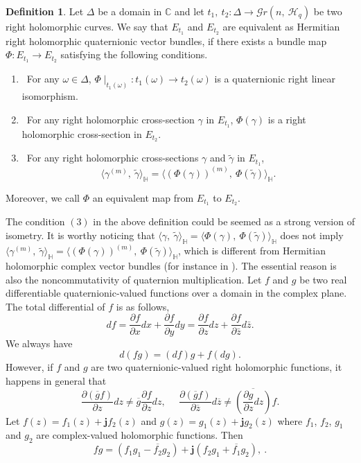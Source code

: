 \documentclass[pdflatex,sn-mathphys-num]{sn-jnl}%
\theoremstyle{thmstyleone}%
\theoremstyle{thmstyletwo}%
\theoremstyle{thmstylethree}%
\newtheorem{definition}{Definition}%
\theoremstyle{definition}
\newtheorem{definition}[theorem]{Definition}
\theoremstyle{remark}
\begin{document}
\begin{definition}\label{QBE}
	Let $\Delta$ be a domain in $\mathbb{C}$ and let $t_1,\ t_2:\Delta\rightarrow\mathcal{G}r(n,\ \mathcal{H}_q)$ be two right holomorphic curves. We say that $E_{t_1}$ and $E_{t_2}$ are equivalent as Hermitian right holomorphic quaternionic vector bundles, if there exists a bundle map $\Phi: E_{t_1} \rightarrow E_{t_2}$ satisfying the following conditions.
	\begin{enumerate}
		\item[(1)] \ For any $\omega\in\Delta$, $\Phi\mid_{t_1(\omega)}:t_1(\omega)\rightarrow t_2(\omega)$ is a quaternionic right linear isomorphism. \\
		\item[(2)] \ For any right holomorphic cross-section $\gamma$ in $E_{t_1}$, $\Phi(\gamma)$ is a right holomorphic cross-section  in $E_{t_2}$.\\
		\item[(3)] \ For any right holomorphic cross-sections $\gamma$ and $\widetilde{\gamma}$ in $E_{t_1}$,
		\[
		\langle \gamma^{(m)},\ \widetilde{\gamma}\rangle_{\mathbb{H}}=\langle(\Phi(\gamma))^{(m)},\ \Phi(\widetilde{\gamma}) \rangle_{\mathbb{H}}.
		\]
	\end{enumerate}
Moreover, we call $\Phi$ an equivalent map from $E_{t_1}$ to $E_{t_2}$.
\end{definition}

The condition $(3)$ in the  above definition could be seemed as a strong version of isometry. It is worthy noticing that $\langle \gamma,\ \widetilde{\gamma}\rangle_{\mathbb{H}}=\langle\Phi(\gamma),\ \Phi(\widetilde{\gamma}) \rangle_{\mathbb{H}}$ does not imply $\langle \gamma^{(m)},\ \widetilde{\gamma}\rangle_{\mathbb{H}}=\langle(\Phi(\gamma))^{(m)},\ \Phi(\widetilde{\gamma}) \rangle_{\mathbb{H}}$, which is different from Hermitian holomorphic complex vector bundles (for instance in \cite{CD}). The essential reason is also the noncommutativity of quaternion multiplication. Let $f$ and $g$ be two real differentiable quaternionic-valued functions over a domain in the complex plane. The total differential of $f$ is as follows,
\[
	df=\frac{\partial f}{\partial x}dx+\frac{\partial f}{\partial y}dy
	= \frac{\partial f}{\partial z}dz+\frac{\partial f}{\partial \bar{z}}d\bar{z}.
\]
We always have
\[
d(fg)=(df)g+f(dg).
\]
However, if $f$ and $g$ are two quaternionic-valued right holomorphic functions, it happens in general that
\[
\frac{\partial (\overline{g}f)}{\partial z}dz\ne \overline{g}\frac{\partial f}{\partial z}dz,\ \ \ \ \ \
\frac{\partial (\overline{g}f)}{\partial \overline{z}}d\overline{z}\ne  \overline{(\frac{\partial g}{\partial z}dz)} f.
\]
Let $f(z)=f_1(z)+\boldsymbol{j}f_2(z)$ and $g(z)=g_1(z)+\boldsymbol{j}g_2(z)$ where $f_1$, $f_2$, $g_1$ and $g_2$ are complex-valued holomorphic functions. Then
    $$fg=(f_1g_1-\overline{f_2}g_2)+\boldsymbol{j}(f_2g_1+\overline{f_1}g_2),\ .$$
\end{document}
